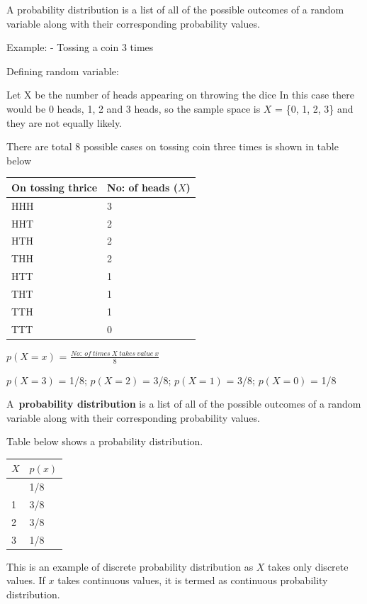\documentclass[
]{book}
\begin{document}
A probability distribution is a list of all of the possible outcomes of
a random variable along with their corresponding probability values.

Example: - Tossing a coin 3 times

Defining random variable:

Let X be the number of heads appearing on throwing the dice In this case
there would be 0 heads, 1, 2 and 3 heads, so the sample space is \(X\) =
\{0, 1, 2, 3\} and they are not equally likely.

There are total 8 possible cases on tossing coin three times is shown in
table below

\begin{longtable}[]{@{}ll@{}}
\toprule\noalign{}
On tossing thrice & No: of heads (\(X\)) \\
\midrule\noalign{}
\endhead
\bottomrule\noalign{}
\endlastfoot
HHH & 3 \\
HHT & 2 \\
HTH & 2 \\
THH & 2 \\
HTT & 1 \\
THT & 1 \\
TTH & 1 \\
TTT & 0 \\
\end{longtable}

\(p(X = x)\) = \(\frac{No: \ of \ times\ X\ takes\ value\ x}{8}\)

\(p(X = 3)\) = 1/8; \(p(X = 2)\) = 3/8; \(p(X = 1)\) = 3/8; \(p(X = 0)\) = 1/8

A~\textbf{probability distribution} is a list of all of the possible outcomes
of a random variable along with their corresponding probability values.

Table below shows a probability distribution.

\begin{longtable}[]{@{}ll@{}}
\toprule\noalign{}
\(X\) & \(p(x)\) \\
\midrule\noalign{}
\endhead
\bottomrule\noalign{}
\endlastfoot
0 & 1/8 \\
1 & 3/8 \\
2 & 3/8 \\
3 & 1/8 \\
\end{longtable}

This is an example of discrete probability distribution as \(X\) takes
only discrete values. If \(x\) takes continuous values, it is termed as
continuous probability distribution.
\end{document}
